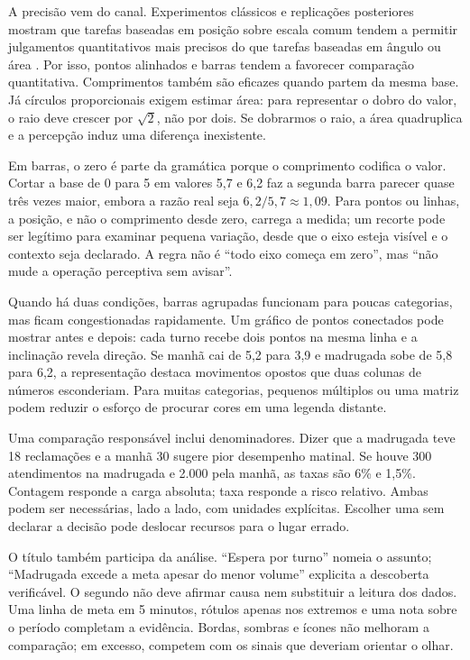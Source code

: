 A precisão vem do canal. Experimentos clássicos e replicações posteriores mostram que tarefas baseadas em posição sobre escala comum tendem a permitir julgamentos quantitativos mais precisos do que tarefas baseadas em ângulo ou área \cite{cleveland1984,heer2010,zeng2023}. Por isso, pontos alinhados e barras tendem a favorecer comparação quantitativa. Comprimentos também são eficazes quando partem da mesma base. Já círculos proporcionais exigem estimar área: para representar o dobro do valor, o raio deve crescer por $\sqrt{2}$, não por dois. Se dobrarmos o raio, a área quadruplica e a percepção induz uma diferença inexistente.

Em barras, o zero é parte da gramática porque o comprimento codifica o valor. Cortar a base de 0 para 5 em valores 5,7 e 6,2 faz a segunda barra parecer quase três vezes maior, embora a razão real seja $6{,}2/5{,}7\approx1{,}09$. Para pontos ou linhas, a posição, e não o comprimento desde zero, carrega a medida; um recorte pode ser legítimo para examinar pequena variação, desde que o eixo esteja visível e o contexto seja declarado. A regra não é ``todo eixo começa em zero'', mas ``não mude a operação perceptiva sem avisar''.

Quando há duas condições, barras agrupadas funcionam para poucas categorias, mas ficam congestionadas rapidamente. Um gráfico de pontos conectados pode mostrar antes e depois: cada turno recebe dois pontos na mesma linha e a inclinação revela direção. Se manhã cai de 5,2 para 3,9 e madrugada sobe de 5,8 para 6,2, a representação destaca movimentos opostos que duas colunas de números esconderiam. Para muitas categorias, pequenos múltiplos ou uma matriz podem reduzir o esforço de procurar cores em uma legenda distante.

Uma comparação responsável inclui denominadores. Dizer que a madrugada teve 18 reclamações e a manhã 30 sugere pior desempenho matinal. Se houve 300 atendimentos na madrugada e 2.000 pela manhã, as taxas são 6\% e 1,5\%. Contagem responde a carga absoluta; taxa responde a risco relativo. Ambas podem ser necessárias, lado a lado, com unidades explícitas. Escolher uma sem declarar a decisão pode deslocar recursos para o lugar errado.

O título também participa da análise. ``Espera por turno'' nomeia o assunto; ``Madrugada excede a meta apesar do menor volume'' explicita a descoberta verificável. O segundo não deve afirmar causa nem substituir a leitura dos dados. Uma linha de meta em 5 minutos, rótulos apenas nos extremos e uma nota sobre o período completam a evidência. Bordas, sombras e ícones não melhoram a comparação; em excesso, competem com os sinais que deveriam orientar o olhar.

